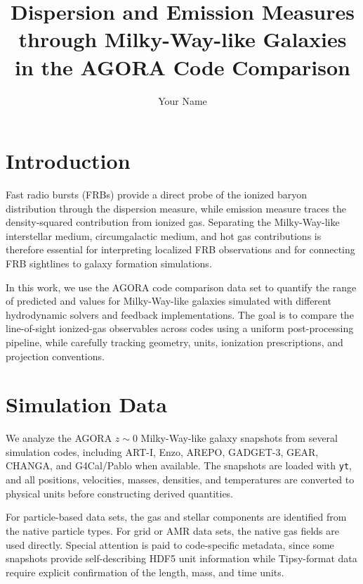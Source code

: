 \documentclass[twocolumn]{aastex631}
\newcommand{\DM}{\mathrm{DM}}
\newcommand{\EM}{\mathrm{EM}}
\begin{document}
\title{Dispersion and Emission Measures through Milky-Way-like Galaxies in the AGORA Code Comparison}

\author{Your Name}

\begin{abstract}
\end{abstract}


\section{Introduction}\label{sec:intro}
Fast radio bursts (FRBs) provide a direct probe of the ionized baryon distribution through the dispersion measure, while emission measure traces the density-squared contribution from ionized gas.  Separating the Milky-Way-like interstellar medium, circumgalactic medium, and hot gas contributions is therefore essential for interpreting localized FRB observations and for connecting FRB sightlines to galaxy formation simulations.

In this work, we use the AGORA code comparison data set to quantify the range of predicted \DM{} and \EM{} values for Milky-Way-like galaxies simulated with different hydrodynamic solvers and feedback implementations.  The goal is to compare the line-of-sight ionized-gas observables across codes using a uniform post-processing pipeline, while carefully tracking geometry, units, ionization prescriptions, and projection conventions.

\section{Simulation Data}\label{sec:data}
We analyze the AGORA $z\sim0$ Milky-Way-like galaxy snapshots from several simulation codes, including ART-I, Enzo, AREPO, GADGET-3, GEAR, CHANGA, and G4Cal/Pablo when available.  The snapshots are loaded with \texttt{yt}, and all positions, velocities, masses, densities, and temperatures are converted to physical units before constructing derived quantities.

For particle-based data sets, the gas and stellar components are identified from the native particle types.  For grid or AMR data sets, the native gas fields are used directly.  Special attention is paid to code-specific metadata, since some snapshots provide self-describing HDF5 unit information while Tipsy-format data require explicit confirmation of the length, mass, and time units.
\end{document}
